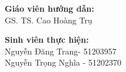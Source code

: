 \documentclass[12pt]{extarticle}
\begin{document}
\begin{titlepage}
\begin{flushright}
\begin{minipage}{0.7\textwidth}

\end{minipage}
\end{flushright}

\begin{flushleft} \large
\textbf{Giáo viên hướng dẫn:}\\
GS. TS. Cao Hoàng Trụ\\[1.0cm]
\end{flushleft}

\begin{flushleft} \large
\textbf{Sinh viên thực hiện:}\\
Nguyễn Đăng Trang- 51203957\\
Nguyễn Trọng Nghĩa - 51202370\\[1.5cm]
\end{flushleft}







\end{titlepage}
\end{document}
